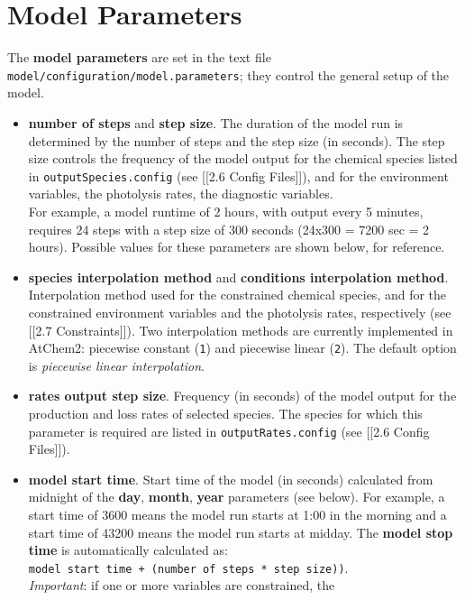 \section{Model Parameters} \label{sec:parameters}

The \textbf{model parameters} are set in the text file
\texttt{model/configuration/model.parameters}; they control the general
setup of the model.

\begin{itemize}
\item
  \textbf{number of steps} and \textbf{step size}. The duration of the
  model run is determined by the number of steps and the step size (in
  seconds). The step size controls the frequency of the model output for
  the chemical species listed in \texttt{outputSpecies.config} (see
  {[}{[}2.6 Config Files{]}{]}), and for the environment variables, the
  photolysis rates, the diagnostic variables.\\
  For example, a model runtime of 2 hours, with output every 5 minutes,
  requires 24 steps with a step size of 300 seconds (24x300 = 7200 sec =
  2 hours). Possible values for these parameters are shown below, for
  reference.
\item
  \textbf{species interpolation method} and \textbf{conditions
  interpolation method}. Interpolation method used for the constrained
  chemical species, and for the constrained environment variables and
  the photolysis rates, respectively (see {[}{[}2.7 Constraints{]}{]}).
  Two interpolation methods are currently implemented in AtChem2:
  piecewise constant (\texttt{1}) and piecewise linear (\texttt{2}). The
  default option is \emph{piecewise linear interpolation}.
\item
  \textbf{rates output step size}. Frequency (in seconds) of the model
  output for the production and loss rates of selected species. The
  species for which this parameter is required are listed in
  \texttt{outputRates.config} (see {[}{[}2.6 Config Files{]}{]}).
\item
  \textbf{model start time}. Start time of the model (in seconds)
  calculated from midnight of the \textbf{day}, \textbf{month},
  \textbf{year} parameters (see below). For example, a start time of
  3600 means the model run starts at 1:00 in the morning and a start
  time of 43200 means the model run starts at midday. The \textbf{model
  stop time} is automatically calculated as:
  \texttt{model\ start\ time\ +\ (number\ of\ steps\ *\ step\ size))}.\\
  \emph{Important}: if one or more variables are constrained, the

\end{itemize}

